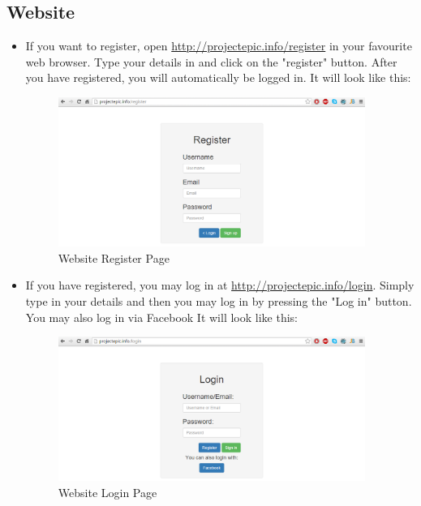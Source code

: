 \documentclass{article}
\begin{document}
\subsection{Website}
    \begin{itemize}
        \item If you want to register, open \url{http://projectepic.info/register} in your favourite web browser. Type your details in and click on the "register" button. After you have registered, you will automatically be logged in. It will look like this: 
        \begin{figure}[H]
                \centering
                \includegraphics[width=10cm]{webPics/register}
                \caption{Website Register Page}
                \label{fig}
            \end{figure}       
        \item {If you have registered, you may log in at \url{http://projectepic.info/login}. Simply type in your details and then you may log in by pressing the "Log in" button. You may also log in via Facebook It will look like this: 
        \begin{figure}[H]
                \centering
                \includegraphics[width=10cm]{webPics/login}
                \caption{Website Login Page}
                \label{fig}
            \end{figure}}
        

\end{itemize}
\end{document}
